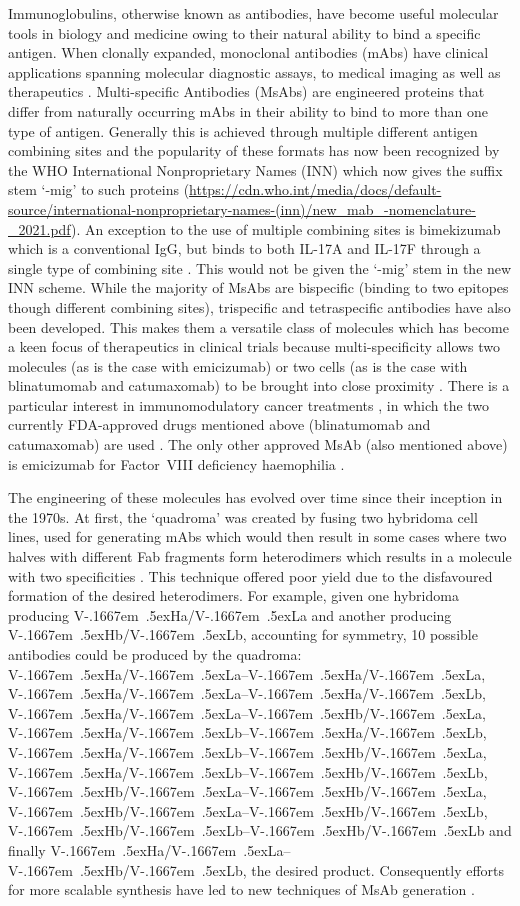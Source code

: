 \documentclass[a4paper]{article}
\newcommand{\VH}{\mbox{V\kern-.1667em \lower.5ex\hbox{\scriptsize H}}}
\newcommand{\VL}{\mbox{V\kern-.1667em \lower.5ex\hbox{\scriptsize L}}}
\begin{document}
Immunoglobulins, otherwise known as antibodies, have become useful molecular
tools in biology and medicine owing to their natural ability to bind a
specific antigen. When clonally expanded, monoclonal antibodies (mAbs)
have clinical applications spanning molecular diagnostic assays, to medical
imaging as well as therapeutics \cite{ma:2021}.
Multi-specific Antibodies (MsAbs) are engineered proteins
that differ from naturally occurring mAbs in their ability to bind to
more than one type of antigen. Generally this is achieved through multiple
different antigen combining sites and the popularity of these formats
has now been recognized by the WHO International Nonproprietary Names
(INN) which now gives the suffix stem `-mig' to such proteins
(\url{https://cdn.who.int/media/docs/default-source/international-nonproprietary-names-(inn)/new_mab_-nomenclature-_2021.pdf}).
An exception to the use of multiple combining sites is bimekizumab
which is a conventional IgG, but binds to both IL-17A and IL-17F
through a single type of combining site \cite{adams:bimekizumab}.
This would not be given the `-mig' stem in the new INN scheme.
While the majority of MsAbs are bispecific (binding to two epitopes though
different combining sites), 
trispecific and tetraspecific antibodies have also been developed.
This makes them a versatile class of molecules
which has become a keen focus of therapeutics in clinical trials
because multi-specificity allows two molecules (as is the case with emicizumab)
or two cells (as is the case with blinatumomab and catumaxomab)
to be brought into close proximity \cite{fan:2015}.
There is a particular interest in immunomodulatory cancer treatments
\cite{labrijn:2019}, in which the two currently FDA-approved
drugs mentioned above (blinatumomab and catumaxomab) are used
\cite{wilke:2017,seimetz:2011}. The only other approved MsAb (also mentioned
above) is emicizumab for Factor~VIII deficiency haemophilia \cite{schmitt:2021}. 

The engineering of these molecules has evolved over time since their
inception in the 1970s. At first, the `quadroma' was created by fusing two
hybridoma cell lines, used for generating mAbs which would then result
in some cases where two halves with different Fab fragments form
heterodimers which results in a molecule with two specificities
\cite{milstein:1983,kontermann:2015}. This
technique offered poor yield due to the disfavoured formation of the
desired heterodimers. For example, given one hybridoma
producing \VH{a}/\VL{a} and another producing \VH{b}/\VL{b}, accounting
for symmetry, 10 possible antibodies could be produced by the quadroma:
\VH{a}/\VL{a}--\VH{a}/\VL{a}, \VH{a}/\VL{a}--\VH{a}/\VL{b},
\VH{a}/\VL{a}--\VH{b}/\VL{a}, \VH{a}/\VL{b}--\VH{a}/\VL{b},
\VH{a}/\VL{b}--\VH{b}/\VL{a}, \VH{a}/\VL{b}--\VH{b}/\VL{b},
\VH{b}/\VL{a}--\VH{b}/\VL{a}, \VH{b}/\VL{a}--\VH{b}/\VL{b},
\VH{b}/\VL{b}--\VH{b}/\VL{b} and finally \VH{a}/\VL{a}--\VH{b}/\VL{b},
the desired product. Consequently efforts for more scalable synthesis have
led to new techniques of MsAb generation \cite{spiess:2015}. 
\end{document}
